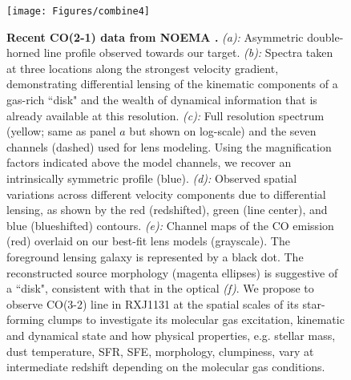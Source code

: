 \documentclass[11pt,a4paper,twoside,graphicx,color]{article}
\newcommand{\bco}{\mbox{CO(2-1)}\xspace}
\newcommand{\cco}{\mbox{CO(3-2)}\xspace}
\newcommand{\kms}{km\,s$^{-1}$\xspace}
\newcommand{\interz}{intermediate-$z$\xspace}
\begin{document}
\begin{figure}[htbp]
\begin{center}
\texttt{[image: Figures/combine4]}
\caption{ 
\textbf{Recent \bco data from NOEMA \citep{Leung16b}.}
{\em (a):}
Asymmetric double-horned line profile observed towards our target.
{\em (b):}
Spectra taken at three locations along the strongest velocity gradient,
demonstrating
differential lensing of the kinematic components of a gas-rich ``disk"
and the wealth of dynamical information that is already available at this resolution.
{\em (c):}
Full resolution spectrum (yellow; same as panel $a$ but shown on log-scale) and the seven channels (dashed) used for lens modeling.
Using the magnification factors indicated above the model channels, we recover an intrinsically symmetric profile (blue).
{\em (d):}
Observed spatial variations across different velocity components due to
differential lensing,
as shown by the red (redshifted),
green (line center), and blue (blueshifted) contours.
{\em (e):}
Channel maps of the CO emission (red)
overlaid on our best-fit lens models (grayscale).
The foreground lensing galaxy is represented by a black dot.
The reconstructed source morphology (magenta ellipses) is suggestive of a ``disk", 
consistent with that in the optical {\em (f)}.
We propose to observe \cco line in RXJ1131 at the spatial scales of its star-forming clumps
to
investigate
its molecular gas excitation, kinematic and dynamical state and how
physical properties, e.g. stellar mass, dust temperature, SFR, SFE, morphology, clumpiness, 
vary at intermediate redshift depending on the molecular gas conditions.
\label{fig:combine}}
\vspace{-2.15em}
\end{center}
\end{figure}

\clearpage

\end{document}

